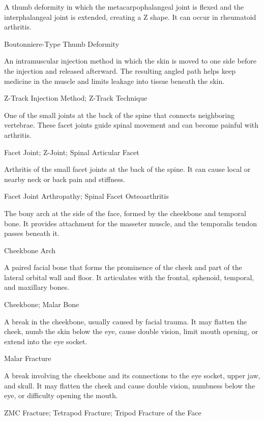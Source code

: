  A thumb deformity in which the metacarpophalangeal joint is flexed and the interphalangeal joint is extended, creating a Z shape. It can occur in rheumatoid arthritis.

\synonyms
Boutonniere-Type Thumb Deformity

 An intramuscular injection method in which the skin is moved to one side before the injection and released afterward. The resulting angled path helps keep medicine in the muscle and limits leakage into tissue beneath the skin.

\synonyms
Z-Track Injection Method; Z-Track Technique

 One of the small joints at the back of the spine that connects neighboring vertebrae. These facet joints guide spinal movement and can become painful with arthritis.

\synonyms
Facet Joint; Z-Joint; Spinal Articular Facet

 Arthritis of the small facet joints at the back of the spine. It can cause local or nearby neck or back pain and stiffness.

\synonyms
Facet Joint Arthropathy; Spinal Facet Osteoarthritis

 The bony arch at the side of the face, formed by the cheekbone and temporal bone. It provides attachment for the masseter muscle, and the temporalis tendon passes beneath it.

\synonyms
Cheekbone Arch

 A paired facial bone that forms the prominence of the cheek and part of the lateral orbital wall and floor. It articulates with the frontal, sphenoid, temporal, and maxillary bones.

\synonyms
Cheekbone; Malar Bone

 A break in the cheekbone, usually caused by facial trauma. It may flatten the cheek, numb the skin below the eye, cause double vision, limit mouth opening, or extend into the eye socket.

\synonyms
Malar Fracture

 A break involving the cheekbone and its connections to the eye socket, upper jaw, and skull. It may flatten the cheek and cause double vision, numbness below the eye, or difficulty opening the mouth.

\synonyms
ZMC Fracture; Tetrapod Fracture; Tripod Fracture of the Face

